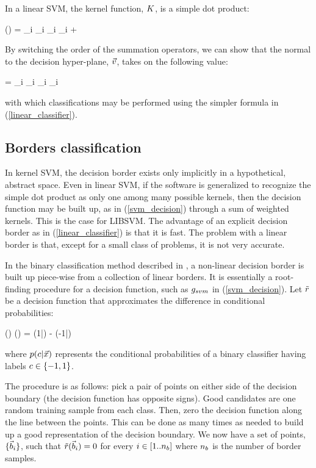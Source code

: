 In a linear SVM, the kernel function, $K$, is a simple dot product:
\begin{eqnnon}
	\svmdecision(\testpoint) = \sum_i \svmcoeff_i \classlabel_i \testpoint \cdot \sample_i + \svmborderconst
\end{eqnnon}
By switching the order of the summation operators, 
we can show that the normal to the
decision hyper-plane, $\vec v$, takes on the following value:
\begin{eqnnon}
	\bordernormal = \sum_i \svmcoeff_i \classlabel_i \sample_i
\end{eqnnon}
with which classifications may be performed using the simpler formula in 
(\ref{linear_classifier}).


\subsection{Borders classification}

\label{border_method}

In kernel SVM, the decision border exists only implicitly in a hypothetical,
abstract space. Even in linear SVM, if the software is generalized to 
recognize the simple dot product as only one among many possible kernels,
then the decision function may be built up, as in (\ref{svm_decision})
through a sum of weighted kernels. This is the case for LIBSVM.
The advantage of an explicit decision border as in 
(\ref{linear_classifier}) is that it is fast. 
The problem with a linear border is that, except for a
small class of problems, it is not very accurate.

In the binary classification method described in \citet{Mills2011},
a non-linear decision border is built up piece-wise from a collection of linear borders.
It is essentially a root-finding procedure for a decision function,
such as $g_{svm}$ in (\ref{svm_decision}).
Let $\tilde r$ be a decision function
that approximates the difference in conditional probabilities:
\begin{eqnnon}
	\decisionfunction(\point) \approx \diffcondprob(\point) = 
	\condprob(1|\point) - \condprob(-1|\point)
	\label{rdef}
\end{eqnnon}
where $p(c|\vec {x})$ represents the conditional probabilities of
a binary classifier having labels $c \in \lbrace -1, 1 \rbrace$.

The procedure is as follows: pick a pair of points on either side of the decision
boundary (the decision function has opposite signs). Good candidates are one
random training sample from each class. Then, zero the decision function
along the line between the points. This can be done as many times as needed
to build up a good representation of the decision boundary.
We now have a set of points, $\lbrace \vec b_i \rbrace$, such that
$\tilde r(\vec b_i)=0$ for every $i \in [1..n_b]$ where
$n_b$ is the number of border samples.

